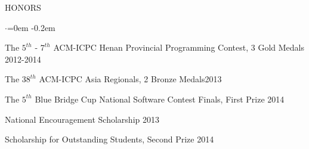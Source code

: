 \documentclass{resume} %
\begin{document}
\begin{rSection}{HONORS}
\begin{list}{$\cdot$}{\leftmargin=0em}
\itemsep -0.2em \vspace{0em}
\item The $5^{th}$ - $7^{th}$ ACM-ICPC Henan Provincial Programming Contest, 3 Gold Medals \hfill {2012-2014}
\item The $38^{th}$ ACM-ICPC Asia Regionals, 2 Bronze Medals\hfill {2013}
\item The $5^{th}$ Blue Bridge Cup National Software Contest Finals, First Prize \hfill {2014}
\item National Encouragement Scholarship \hfill {2013}
\item Scholarship for Outstanding Students, Second Prize \hfill {2014}
\end{list}
\vspace{0.5em}
\end{rSection}
\end{document}
